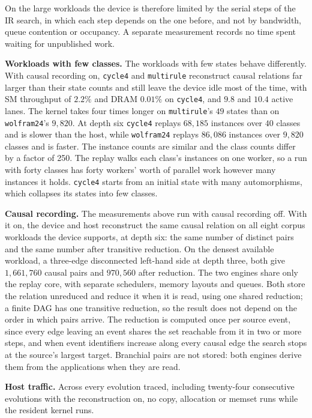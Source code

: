 On the large workloads the device is therefore limited by the serial steps of the IR search, in
which each step depends on the one before, and not by bandwidth, queue contention or occupancy. A
separate measurement records no time spent waiting for unpublished work.

\textbf{Workloads with few classes.} The workloads with few states behave differently. With causal
recording on, \texttt{cycle4} and \texttt{multirule} reconstruct causal relations far larger than
their state counts and still leave the device idle most of the time, with SM throughput of $2.2\%$
and DRAM $0.01\%$ on \texttt{cycle4}, and $9.8$ and $10.4$ active lanes. The kernel takes four
times longer on \texttt{multirule}'s $49$ states than on \texttt{wolfram24}'s $9{,}820$. At depth
six \texttt{cycle4} replays $68{,}185$ instances over $40$ classes and is slower than the host,
while \texttt{wolfram24} replays $86{,}086$ instances over $9{,}820$ classes and is faster. The
instance counts are similar and the class counts differ by a factor of 250. The replay walks each
class's instances on one worker, so a run with forty classes has forty workers' worth of parallel
work however many instances it holds. \texttt{cycle4} starts from an initial state with many
automorphisms, which collapses its states into few classes.

\textbf{Causal recording.} The measurements above run with causal recording off. With it on, the
device and host reconstruct the same causal relation on all eight corpus workloads the device
supports, at depth six: the same number of distinct pairs and the same number after transitive
reduction. On the densest available workload, a three-edge disconnected left-hand side at depth
three, both give $1{,}661{,}760$ causal pairs and $970{,}560$ after reduction. The two engines
share only the replay core, with separate schedulers, memory layouts and queues. Both store the
relation unreduced and reduce it when it is read, using one shared reduction; a finite DAG has one
transitive reduction, so the result does not depend on the order in which pairs arrive. The
reduction is computed once per source event, since every edge leaving an event shares the set
reachable from it in two or more steps, and when event identifiers increase along every causal
edge the search stops at the source's largest target. Branchial pairs are not stored: both engines
derive them from the applications when they are read.

\textbf{Host traffic.} Across every evolution traced, including twenty-four consecutive evolutions
with the reconstruction on, no copy, allocation or memset runs while the resident kernel runs.

